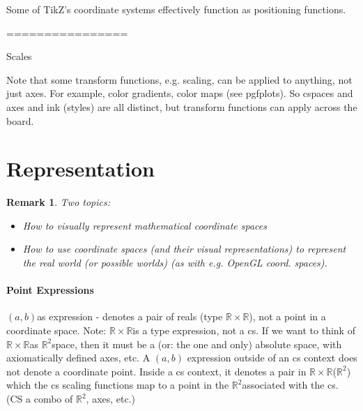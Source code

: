 \documentclass[12pt]{tufte-handout}
\numberwithin{equation}{subsection}
\numberwithin{equation}{subsection}
\newtheorem{remark}{Remark}
\newcommand\cspace{coordinate space}
\newcommand\ab{\((a,b)\)}
\newcommand\RR{\(\mathds{R}\times\mathds{R}\)}
\newcommand\Rtwo{\(\mathds{R}^2\)}
\begin{document}
  Some of TikZ's coordinate systems effectively function as positioning functions.

  ================

  Scales

  Note that some transform functions, e.g. scaling, can be applied to
  anything, not just axes.  For example, color gradients, color maps
  (see pgfplots).  So cspaces and axes and ink (styles) are all
  distinct, but transform functions can apply across the board.





  \part{Representation}
  \label{sect:representation}

  \begin{remark}
    Two topics:
    \begin{itemize}
    \item How to visually represent mathematical \cspace{}s
    \item How to use \cspace{}s (and their visual representations) to
      represent the real world (or possible worlds) (as with e.g. OpenGL coord. spaces).
    \end{itemize}
  \end{remark}

  \subsection{Point Expressions}
  \label{subs:pointexprs}

  \ab as expression - denotes a pair of reals (type \RR), not a point in
  a \cspace{}.  Note: \RR is a type expression, not a cs.  If we want to
  think of \RR as \Rtwo space, then it must be a (or: the one and only)
  absolute space, with axiomatically defined axes, etc.  A \ab
  expression outside of an cs context does not denote a coordinate
  point.  Inside a cs context, it denotes a pair in \RR (\Rtwo) which
  the cs scaling functions map to a point in the \Rtwo associated with
  the cs.  (CS a combo of \Rtwo, axes, etc.)
\end{document}
